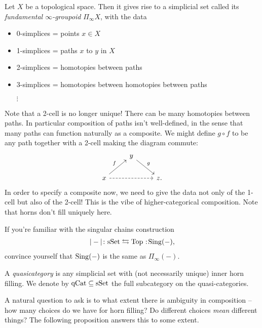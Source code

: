 \documentclass[11pt,openany]{book}
\begin{document}
\begin{example} Let $X$ be a topological space. Then it gives rise to a simplicial set called its \textit{fundamental $\infty$-groupoid} $\Pi_{\infty} X$, with the data
\begin{itemize}
    \item 0-simplices = points $x \in X$
    \item 1-simplices = paths $x$ to $y$ in $X$
    \item 2-simplices = homotopies between paths
    \item 3-simplices = homotopies between homotopies between paths
    \item[$\vdots$]
\end{itemize}
Note that a 2-cell is no longer unique! There can be many homotopies between paths. In particular composition of paths isn't well-defined, in the sense that many paths can function naturally as a composite. We might define $g\circ f$ to be any path together with a 2-cell making the diagram commute:
\[ \begin{tikzcd}
     & y\ar[dr,"g" above right]\\
    x\ar[ur,"f" above left]\ar[rr,dashed] &  & z.
\end{tikzcd} \]
In order to specify a composite now, we need to give the data not only of the 1-cell but also of the 2-cell! This is the vibe of higher-categorical composition. Note that horns don't fill uniquely here.
\end{example}

\begin{exercise} If you're familiar with the singular chains construction
\begin{align*}
    |-| \colon \sSet \leftrightarrows \Top \noloc \Sing(-),
\end{align*}
convince yourself that $\mathrm{Sing}(-)$ is the same as $\Pi_\infty(-)$.
\end{exercise}


\begin{definition} A \textit{quasicategory} is any simplicial set with (not necessarily unique) inner horn filling. We denote by $\mathrm{qCat} \subseteq \mathrm{sSet}$ the full subcategory on the quasi-categories.
\end{definition}

A natural question to ask is to what extent there is ambiguity in composition -- how many choices do we have for horn filling? Do different choices \textit{mean} different things? The following proposition answers this to some extent.
\end{document}
